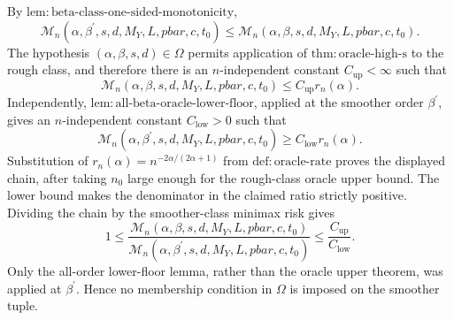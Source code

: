 By \(\mathrm{lem:beta\text{-}class\text{-}one\text{-}sided\text{-}monotonicity}\),
\[
\mathcal M_n(\alpha,\beta^{\prime},s,d,M_Y,L,pbar,c,t_0)
\le
\mathcal M_n(\alpha,\beta,s,d,M_Y,L,pbar,c,t_0).
\]
The hypothesis \((\alpha,\beta,s,d)\in\Omega\) permits application of \(\mathrm{thm:oracle\text{-}high\text{-}s}\) to the rough class, and therefore there is an \(n\)-independent constant \(C_{\mathrm{up}}<\infty\) such that
\[
\mathcal M_n(\alpha,\beta,s,d,M_Y,L,pbar,c,t_0)
\le C_{\mathrm{up}}r_n(\alpha).
\]
Independently, \(\mathrm{lem:all\text{-}beta\text{-}oracle\text{-}lower\text{-}floor}\), applied at the smoother order \(\beta^{\prime}\), gives an \(n\)-independent constant \(C_{\mathrm{low}}>0\) such that
\[
\mathcal M_n(\alpha,\beta^{\prime},s,d,M_Y,L,pbar,c,t_0)
\ge C_{\mathrm{low}}r_n(\alpha).
\]
Substitution of \(r_n(\alpha)=n^{-2\alpha/(2\alpha+1)}\) from \(\mathrm{def:oracle\text{-}rate}\) proves the displayed chain, after taking \(n_0\) large enough for the rough-class oracle upper bound. The lower bound makes the denominator in the claimed ratio strictly positive. Dividing the chain by the smoother-class minimax risk gives
\[
1\le
\frac{\mathcal M_n(\alpha,\beta,s,d,M_Y,L,pbar,c,t_0)}
{\mathcal M_n(\alpha,\beta^{\prime},s,d,M_Y,L,pbar,c,t_0)}
\le \frac{C_{\mathrm{up}}}{C_{\mathrm{low}}}.
\]
Only the all-order lower-floor lemma, rather than the oracle upper theorem, was applied at \(\beta^{\prime}\). Hence no membership condition in \(\Omega\) is imposed on the smoother tuple.
